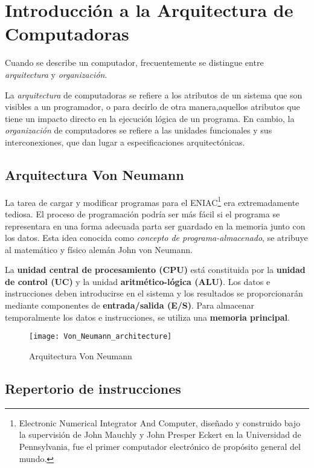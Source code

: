 \section{Introducción a la Arquitectura de Computadoras}

Cuando se describe un computador, frecuentemente se distingue entre \textit{arquitectura} y \textit{organización}.

La \textit{arquitectura} de computadoras se refiere a los atributos de un sistema que son visibles a un programador, o para decirlo de otra manera,aquellos atributos que tiene un impacto directo en la ejecución lógica de un programa.
En cambio, la \textit{organización} de computadores se refiere a las unidades funcionales y sus interconexiones, que dan lugar a especificaciones arquitectónicas.

\subsection{Arquitectura Von Neumann}

La tarea de cargar y modificar programas para el ENIAC\footnote{Electronic Numerical Integrator And Computer, diseñado y construido bajo la supervisión de John Mauchly y John Presper Eckert en la Universidad de Pennsylvania, fue el primer computador electrónico de propósito general del mundo.} era extremadamente tediosa. El proceso de programación podría ser más fácil si el programa se representara en una forma adecuada parta ser guardado en la memoria junto con los datos.
Esta idea conocida como \textit{concepto de programa-almacenado}, se atribuye al matemático y físico alemán John von Neumann.

La \textbf{unidad central de procesamiento (CPU)} está constituida por la \textbf{unidad de control (UC)} y la unidad \textbf{aritmético-lógica (ALU)}.
Los datos e instrucciones deben introducirse en el sistema y los resultados se proporcionarán mediante componentes de \textbf{entrada/salida (E/S)}.
Para almacenar temporalmente los datos e instrucciones, se utiliza una \textbf{memoria principal}.

\begin{figure}[h]
  \centering
  \texttt{[image: Von\_Neumann\_architecture]}
  \caption{Arquitectura Von Neumann}
\end{figure}
\subsection{Repertorio de instrucciones}

